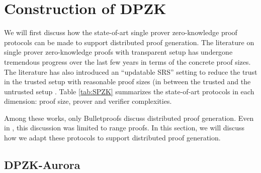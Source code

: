 \section{Construction of DPZK}
We will first discuss how the state-of-art single prover zero-knowledge proof protocols can be made to support distributed proof generation.
The literature on single prover zero-knowledge proofs with transparent setup has undergone tremendous progress over the last few years in terms of the concrete proof sizes. The literature has also introduced an ``updatable SRS'' setting \cite{sonic, libra, supersonic} to reduce the trust in the trusted setup with reasonable proof sizes (in between the trusted \cite{pinocchio} and the untrusted setup \cite{aurora, bulletproofs}. \cite{Check} 
Table \ref{tab:SPZK} summarizes the state-of-art protocols in each dimension: proof size, prover and verifier complexities.

Among these works, only Bulletproofs \cite{bulletproofs} discuss distributed proof generation. Even in \cite{bulletproofs}, this discussion was limited to range proofs. In this section, we will discuss how we adapt these protocols to support distributed proof generation. %

\subsection{DPZK-Aurora}


